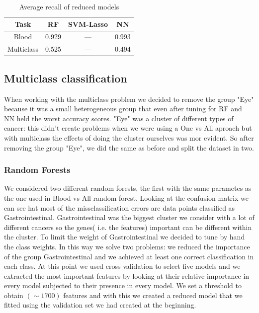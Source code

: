 \documentclass[a4paper,11pt, oneside]{article}  %
\begin{document}
\begin{table}[h!]
	\caption{Average recall of reduced models}
	\centering
	\begin{tabular}{c c c c}
		\hline\hline
		Task & RF & SVM-Lasso & NN \\ [0.5ex] %
		\hline
		Blood & 0.929 & --- & 0.993 \\
		Multiclass & 0.525 &  --- & 0.494 \\ [1ex]
		\hline
	\end{tabular}
	\label{table:reduced_models}
\end{table}





\subsection{Multiclass classification}
When working with the multiclass problem we decided to remove the group "Eye" because it was a small heterogeneous group that even after tuning for RF and NN held the worst accuracy scores. "Eye" was a cluster of different types of cancer: this didn't create problems when we were using a One vs All aproach but with multiclass the effects of doing the cluster ourselves was mor evident.  
So after removing the group "Eye", we did the same as before and split the dataset in two.

\subsubsection{Random Forests}
We considered two different random forests, the first with the same parametes as the one used in Blood vs All random forest. Looking at the confusion matrix we can see hat most of the missclassification errors are data points classified as Gastrointestinal. Gastrointestinal was the biggest cluster we consider with a lot of different cancers so the genes( i.e. the features) important can be different within the cluster. To limit the weight of Gastrointestinal we decided to tune by hand the class weights. In this way we solve two problems: we reduced the importance of the group Gastrointestinal and we achieved at least one correct classification in each class. At this point we used cross validation to select five models and we extracted the most important features by looking at their relative importance in every model subjected to their presence in every model. We set a threshold to obtain  $(\sim   1700)$ features and with this we created a reduced model that we fitted using the validation set we had created at the beginning.
\end{document}
